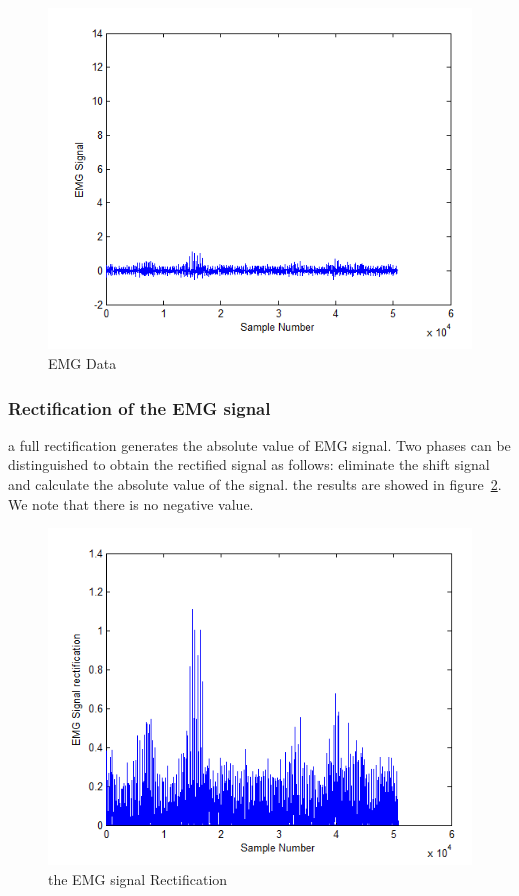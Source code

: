 \documentclass[conference]{IEEEtran}
\begin{document}
\begin{figure}[!hb]
    \hspace*{1.2 cm}
    \includegraphics[scale=0.40]{fig1.png}
    \caption{EMG Data}
    \label{fig:data}
\end{figure}

\subsubsection{Rectification of the EMG signal} \label{sub:RectificationtheEMGsignal}\par
a full rectification generates the absolute value of EMG signal. Two phases can be distinguished to obtain the rectified signal as follows: eliminate the shift signal and calculate the absolute value of the signal. the results are showed in figure~\ref{fig:rect}. We note that there is no negative value. \par

\begin{figure}
    \hspace*{1.2 cm}
    \includegraphics[scale=0.40]{fig2.png}
    \caption{the EMG signal Rectification}
    \label{fig:rect}
\end{figure}
\end{document}
